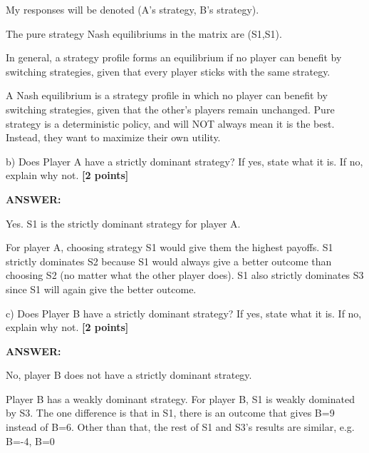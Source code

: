 \documentclass{article}
\begin{document}
%
%

My responses will be denoted (A's strategy, B's strategy).

The pure strategy Nash equilibriums in the matrix are (S1,S1).

In general, a strategy profile forms an equilibrium if no player can benefit by switching strategies, given that every player sticks with the same strategy.

A Nash equilibrium is a strategy profile in which no player can benefit by switching strategies, given that the other's players remain unchanged. Pure strategy is a deterministic policy, and will NOT always mean it is the best. Instead, they want to maximize their own utility.

\vspace{5mm}

\noindent b) Does Player A have a strictly dominant strategy? If yes, state what it is. If no, explain 
why not. \textbf{[2 points]}

\vspace{3mm}

\noindent \textbf{ANSWER:}

%
%

Yes. S1 is the strictly dominant strategy for player A. 

For player A, choosing strategy S1 would give them the highest payoffs. S1 strictly dominates S2 because S1 would always give a better outcome than choosing S2 (no matter what the other player does). S1 also strictly dominates S3 since S1 will again give the better outcome.

\vspace{5mm}

\noindent c) Does Player B have a strictly dominant strategy? If yes, state what it is. If no, explain 
why not.\textbf{ [2 points] }

\vspace{3mm}

\noindent \textbf{ANSWER:}

%
%

No, player B does not have a strictly dominant strategy. 

Player B has a weakly dominant strategy. For player B, S1 is weakly dominated by S3. The one difference is that in S1, there is an outcome that gives B=9 instead of B=6. Other than that, the rest of S1 and S3's results are similar, e.g. B=-4, B=0
\end{document}
